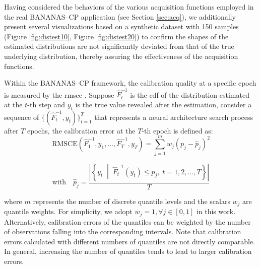\begin{description}[leftmargin=0cm, listparindent=\parindent]
Having considered the behaviors of the various acquisition functions employed in the real BANANAS--CP application (see Section \ref{sec:acq}), we additionally present several visualizations based on a synthetic dataset with 150 samples (Figure \ref{fig:distest10}, Figure \ref{fig:distest20}) to confirm the shapes of the estimated distributions are not significantly deviated from that of the true underlying distribution, thereby assuring the effectiveness of the acquisition functions.

\vspace{0.5em}
\item[Evaluation Metrics] Within the BANANAS--CP framework, the calibration quality at a specific epoch is measured by the \gls{rmsce} \cite{pmlr-v80-kuleshov18a}. Suppose $\hat{F}^{-1}_t$ is the \gls{cdf} of the distribution estimated at the  $t$-th step and $y_t$ is the true value revealed after the estimation, consider a sequence of $\{(\hat{F}^{-1}_t, y_t)\}_{t=1}^T$ that represents a neural architecture search process after $T$ epochs, the calibration error at the $T$-th epoch is defined as:
	\vspace{0.5em}
	\begin{equation}
	\text{RMSCE} \left( \hat{F}^{-1}_1, y_1, \dots, \hat{F}^{-1}_T, y_T \right) = \sum_{j=1}^m w_j \left( p_j - \hat{p}_j \right)^2
	\label{rmsce}
	\end{equation}

	\[
	\text{with} \quad
	\hat{p}_j = \frac{\left| \left\{ y_t \;\middle|\; \hat{F}^{-1}_t(y_t) \le p_j,\; t = 1, 2, \dots, T \right\} \right|}{T}
	\]

\noindent where $m$ represents the number of discrete quantile levels and the scalars $w_j$ are  quantile weights. For simplicity, we adopt  $w_j=1, \forall j \in[0,1]$ in this work. Alternatively, calibration errors of the quantiles can be weighted by the number of observations falling into the corresponding intervals. Note that calibration errors calculated with different numbers of quantiles are not directly comparable. In general, increasing the number of quantiles tends to lead to larger calibration errors.	
\end{description}


